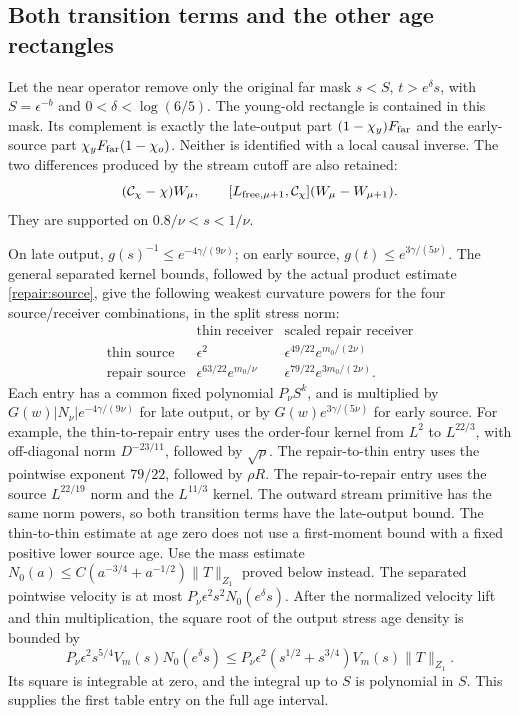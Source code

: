 \subsection{Both transition terms and the other age rectangles}

Let the near operator remove only the original far mask
$s<S$, $t>e^\delta s$, with $S=\epsilon^{-b}$ and
$0<\delta<\log(6/5)$. The young-old rectangle is contained in this
mask. Its complement is exactly the late-output part
$(1-\chi_y)F_{\rm far}$ and the early-source part
$\chi_yF_{\rm far}(1-\chi_o)$. Neither is identified with a local
causal inverse. The two differences produced by the stream cutoff
are also retained:
\[
 (\mathcal C_\chi-\chi)W_\mu,
 \qquad [L_{{\rm free},\mu+1},\mathcal C_\chi]
                   (W_\mu-W_{\mu+1}).
\]
They are supported on $0.8/\nu<s<1/\nu$.

On late output, $g(s)^{-1}\le e^{-4\gamma/(9\nu)}$; on early
source, $g(t)\le e^{3\gamma/(5\nu)}$. The general separated
kernel bounds, followed by the actual product estimate
\eqref{repair:source}, give the following weakest curvature powers
for the four source/receiver combinations, in the split stress norm:
\[
 \begin{array}{c|cc}
   &\text{thin receiver}&\text{scaled repair receiver}\\ \hline
 \text{thin source}&\epsilon^2&
      \epsilon^{49/22}e^{m_0/(2\nu)}\\
 \text{repair source}&\epsilon^{63/22}e^{m_0/\nu}&
      \epsilon^{79/22}e^{3m_0/(2\nu)}.
 \end{array}
\]
Each entry has a common fixed polynomial $P_\nu S^k$, and is
multiplied by $G(w)|N_\nu|e^{-4\gamma/(9\nu)}$ for late output,
or by $G(w)e^{3\gamma/(5\nu)}$ for early source. For example,
the thin-to-repair entry uses the order-four kernel from $L^2$ to
$L^{22/3}$, with off-diagonal norm $D^{-23/11}$, followed by
$\sqrt\rho$. The repair-to-thin entry uses the pointwise exponent
$79/22$, followed by $\rho R$. The repair-to-repair entry uses
the source $L^{22/19}$ norm and the $L^{11/3}$ kernel. The
outward stream primitive has the same norm powers, so both
transition terms have the late-output bound.
The thin-to-thin estimate at age zero does not use a first-moment
bound with a fixed positive lower source age. Use the mass estimate
$N_0(a)\le C(a^{-3/4}+a^{-1/2})\|T\|_{Z_1}$ proved below instead.
The separated pointwise velocity is at most
$P_\nu\epsilon^2s^2N_0(e^\delta s)$. After the normalized velocity
lift and thin multiplication, the square root of the output stress
age density is bounded by
\[
 P_\nu\epsilon^2s^{5/4}V_m(s)N_0(e^\delta s)
 \le P_\nu\epsilon^2(s^{1/2}+s^{3/4})V_m(s)\|T\|_{Z_1}.
\]
Its square is integrable at zero, and the integral up to $S$ is
polynomial in $S$. This supplies the first table entry on the full
age interval.

